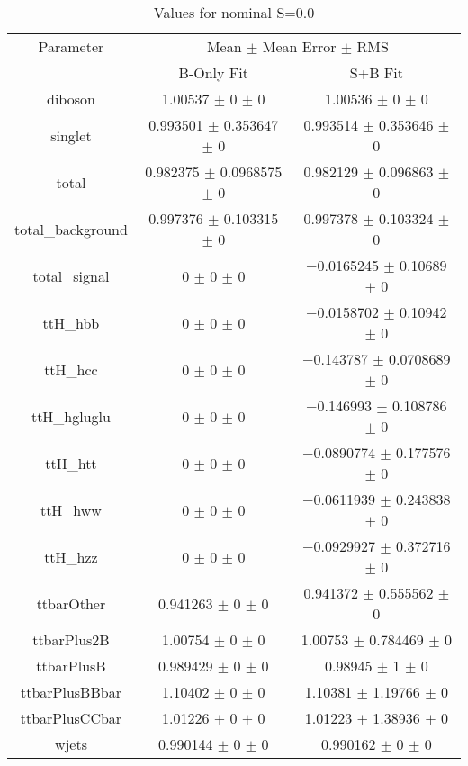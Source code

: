 \begin{table}
\centering
\caption{Values for nominal S=0.0}
\begin{tabular}{ccc}
\toprule
Parameter & \multicolumn{2}{c}{Mean $\pm$ Mean Error $\pm$ RMS}\\
 & B-Only Fit & S+B Fit\\
\midrule
diboson & \num{1.00537} $\pm$ \num{0} $\pm$ \num{0} & \num{1.00536} $\pm$ \num{0} $\pm$ \num{0}\\
singlet & \num{0.993501} $\pm$ \num{0.353647} $\pm$ \num{0} & \num{0.993514} $\pm$ \num{0.353646} $\pm$ \num{0}\\
total & \num{0.982375} $\pm$ \num{0.0968575} $\pm$ \num{0} & \num{0.982129} $\pm$ \num{0.096863} $\pm$ \num{0}\\
total\_background & \num{0.997376} $\pm$ \num{0.103315} $\pm$ \num{0} & \num{0.997378} $\pm$ \num{0.103324} $\pm$ \num{0}\\
total\_signal & \num{0} $\pm$ \num{0} $\pm$ \num{0} & \num{-0.0165245} $\pm$ \num{0.10689} $\pm$ \num{0}\\
ttH\_hbb & \num{0} $\pm$ \num{0} $\pm$ \num{0} & \num{-0.0158702} $\pm$ \num{0.10942} $\pm$ \num{0}\\
ttH\_hcc & \num{0} $\pm$ \num{0} $\pm$ \num{0} & \num{-0.143787} $\pm$ \num{0.0708689} $\pm$ \num{0}\\
ttH\_hgluglu & \num{0} $\pm$ \num{0} $\pm$ \num{0} & \num{-0.146993} $\pm$ \num{0.108786} $\pm$ \num{0}\\
ttH\_htt & \num{0} $\pm$ \num{0} $\pm$ \num{0} & \num{-0.0890774} $\pm$ \num{0.177576} $\pm$ \num{0}\\
ttH\_hww & \num{0} $\pm$ \num{0} $\pm$ \num{0} & \num{-0.0611939} $\pm$ \num{0.243838} $\pm$ \num{0}\\
ttH\_hzz & \num{0} $\pm$ \num{0} $\pm$ \num{0} & \num{-0.0929927} $\pm$ \num{0.372716} $\pm$ \num{0}\\
ttbarOther & \num{0.941263} $\pm$ \num{0} $\pm$ \num{0} & \num{0.941372} $\pm$ \num{0.555562} $\pm$ \num{0}\\
ttbarPlus2B & \num{1.00754} $\pm$ \num{0} $\pm$ \num{0} & \num{1.00753} $\pm$ \num{0.784469} $\pm$ \num{0}\\
ttbarPlusB & \num{0.989429} $\pm$ \num{0} $\pm$ \num{0} & \num{0.98945} $\pm$ \num{1} $\pm$ \num{0}\\
ttbarPlusBBbar & \num{1.10402} $\pm$ \num{0} $\pm$ \num{0} & \num{1.10381} $\pm$ \num{1.19766} $\pm$ \num{0}\\
ttbarPlusCCbar & \num{1.01226} $\pm$ \num{0} $\pm$ \num{0} & \num{1.01223} $\pm$ \num{1.38936} $\pm$ \num{0}\\
wjets & \num{0.990144} $\pm$ \num{0} $\pm$ \num{0} & \num{0.990162} $\pm$ \num{0} $\pm$ \num{0}\\
\bottomrule
\end{tabular}
\end{table}